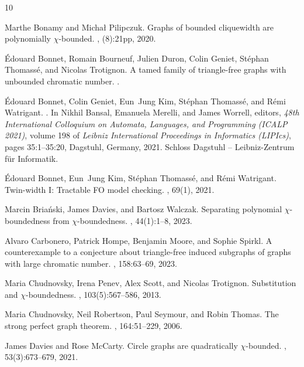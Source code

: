 \documentclass[11pt]{article}
\numberwithin{equation}{section}
\begin{document}
\begin{thebibliography}{10}

Marthe Bonamy and Micha\l{} Pilipczuk.
\newblock Graphs of bounded cliquewidth are polynomially $\chi$-bounded.
, (8):21pp, 2020.

\'Edouard Bonnet, Romain Bourneuf, Julien Duron, Colin Geniet, Stéphan
  Thomassé, and Nicolas Trotignon.
\newblock A tamed family of triangle-free graphs with unbounded chromatic
  number.
.

\'{E}douard Bonnet, Colin Geniet, Eun~Jung Kim, St\'{e}phan Thomass\'{e}, and
  R\'{e}mi Watrigant.
.
\newblock In Nikhil Bansal, Emanuela Merelli, and James Worrell, editors, {\em
  48th International Colloquium on Automata, Languages, and Programming (ICALP
  2021)}, volume 198 of {\em Leibniz International Proceedings in Informatics
  (LIPIcs)}, pages 35:1--35:20, Dagstuhl, Germany, 2021. Schloss Dagstuhl --
  Leibniz-Zentrum f{\"u}r Informatik.

\'{E}douard Bonnet, Eun~Jung Kim, St\'{e}phan Thomass\'{e}, and R\'{e}mi
  Watrigant.
\newblock Twin-width {I}: Tractable {FO} model checking.
, 69(1), 2021.

Marcin Briański, James Davies, and Bartosz Walczak.
\newblock Separating polynomial $\chi$-boundedness from $\chi$-boundedness.
, 44(1):1--8, 2023.

Alvaro Carbonero, Patrick Hompe, Benjamin Moore, and Sophie Spirkl.
\newblock A counterexample to a conjecture about triangle-free induced
  subgraphs of graphs with large chromatic number.
, 158:63--69, 
  2023.

Maria Chudnovsky, Irena Penev, Alex Scott, and Nicolas Trotignon.
\newblock Substitution and $\chi$-boundedness.
, 103(5):567--586,
  2013.

Maria Chudnovsky, Neil Robertson, Paul Seymour, and Robin Thomas.
\newblock The strong perfect graph theorem.
, 164:51--229, 2006.

James Davies and Rose McCarty.
\newblock Circle graphs are quadratically $\chi$-bounded.
, 53(3):673--679,
  2021.


\end{thebibliography}
\end{document}
